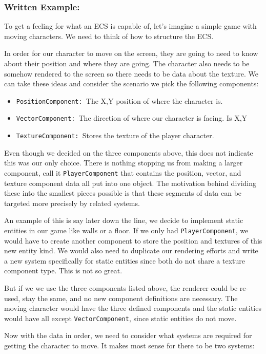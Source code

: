 \subsubsection{Written Example:}
To get a feeling for what an ECS is capable of, let's imagine a simple game with moving characters. We need to think of how to structure the ECS. 

In order for our character to move on the screen, they are going to need to know about their position and where they are going. The character also needs to be somehow rendered to the screen so there needs to be data about the texture. We can take these ideas and consider the scenario we pick the following components:

\begin{itemize}
    \item \texttt{PositionComponent: }The X,Y position of where the character is.
    \item \texttt{VectorComponent: }The direction of where our character is facing. Is X,Y
    \item \texttt{TextureComponent: }Stores the texture of the player character.
\end{itemize}

Even though we decided on the three components above, this does not indicate this was our only choice. There is nothing stopping us from making a larger component, call it \texttt{PlayerComponent} that contains the position, vector, and texture component data all put into one object. The motivation behind dividing these into the smallest pieces possible is that these segments of data can be targeted more precisely by related systems. 

An example of this is say later down the line, we decide to implement static entities in our game like walls or a floor. If we only had \texttt{PlayerComponent}, we would have to create another component to store the position and textures of this new entity kind. We would also need to duplicate our rendering efforts and write a new system specifically for static entities since both do not share a texture component type. This is not so great. 

But if we we use the three components listed above, the renderer could be re-used, stay the same, and no new component definitions are necessary. The moving character would have the three defined components and the static entities would have all except \texttt{VectorComponent}, since static entities do not move.

Now with the data in order, we need to consider what systems are required for getting the character to move. It makes most sense for there to be two systems:

